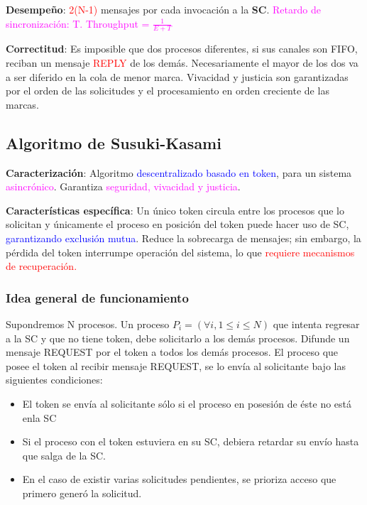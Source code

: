 \textbf{Desempeño}: \textcolor{red}{2(N-1)} mensajes por cada invocación a la \textbf{SC}.  \textcolor{magenta}{Retardo de sincronización: T. Throughput = $\frac{1}{E+T}$}

\textbf{Correctitud}: Es imposible que dos procesos diferentes, si sus canales son FIFO, reciban un mensaje \textcolor{red}{REPLY} de los demás. Necesariamente el mayor de los dos va a ser diferido en la cola de menor marca. Vivacidad y justicia son garantizadas por el orden de las solicitudes y el procesamiento en orden creciente de las marcas.

\subsection{Algoritmo de Susuki-Kasami}

\textbf{Caracterización}: Algoritmo \textcolor{blue}{descentralizado basado en token}, para un sistema \textcolor{magenta}{asincrónico}. Garantiza \textcolor{magenta}{seguridad, vivacidad y justicia}.

\textbf{Características específica}: Un único token circula entre los procesos que lo solicitan y únicamente el proceso en posición del token puede hacer uso de SC, \textcolor{blue}{garantizando exclusión mutua}. Reduce la sobrecarga de mensajes; sin embargo, la pérdida del token interrumpe operación del sistema, lo que \textcolor{red}{requiere mecanismos de recuperación.}

\subsubsection{Idea general de funcionamiento}

Supondremos N procesos. Un proceso $P_i = (\forall i, 1 \leq i \leq N)$ que intenta regresar a la SC y que no tiene token, debe solicitarlo a los demás procesos. Difunde un mensaje REQUEST por el token a todos los demás procesos. El proceso que posee el token al recibir mensaje REQUEST, se lo envía al solicitante bajo las siguientes condiciones: 
\begin{itemize}
    \item El token se envía al solicitante sólo si el proceso en posesión de éste no está enla SC
    \item Si el proceso con el token estuviera en su SC, debiera retardar su envío hasta que salga de la SC.
    \item En el caso de existir varias solicitudes pendientes, se prioriza acceso que primero generó la solicitud.
\end{itemize}

